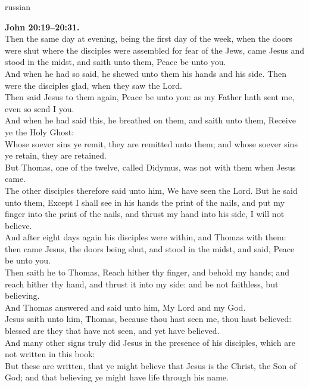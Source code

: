 \documentclass[10pt]{article} %
\begin{document}
{\begin{minipage}[t]{0.45\textwidth}
\begin{otherlanguage*}{russian}
\end{otherlanguage*}
\end{minipage}
\hfill
\begin{minipage}[t]{0.45\textwidth}

\textbf{John 20:19--20:31.}\\
Then the same day at evening, being the first day of the week, when the doors were shut where the disciples were assembled for fear of the Jews, came Jesus and stood in the midst, and saith unto them, Peace be unto you.\\
And when he had so said, he shewed unto them his hands and his side. Then were the disciples glad, when they saw the Lord.\\
Then said Jesus to them again, Peace be unto you: as my Father hath sent me, even so send I you.\\
And when he had said this, he breathed on them, and saith unto them, Receive ye the Holy Ghost:\\
Whose soever sins ye remit, they are remitted unto them; and whose soever sins ye retain, they are retained.\\
But Thomas, one of the twelve, called Didymus, was not with them when Jesus came.\\
The other disciples therefore said unto him, We have seen the Lord. But he said unto them, Except I shall see in his hands the print of the nails, and put my finger into the print of the nails, and thrust my hand into his side, I will not believe.\\
And after eight days again his disciples were within, and Thomas with them: then came Jesus, the doors being shut, and stood in the midst, and said, Peace be unto you.\\
Then saith he to Thomas, Reach hither thy finger, and behold my hands; and reach hither thy hand, and thrust it into my side: and be not faithless, but believing.\\
And Thomas answered and said unto him, My Lord and my God.\\
Jesus saith unto him, Thomas, because thou hast seen me, thou hast believed: blessed are they that have not seen, and yet have believed.\\
And many other signs truly did Jesus in the presence of his disciples, which are not written in this book:\\
But these are written, that ye might believe that Jesus is the Christ, the Son of God; and that believing ye might have life through his name.\\

\end{minipage}}
\end{document}
